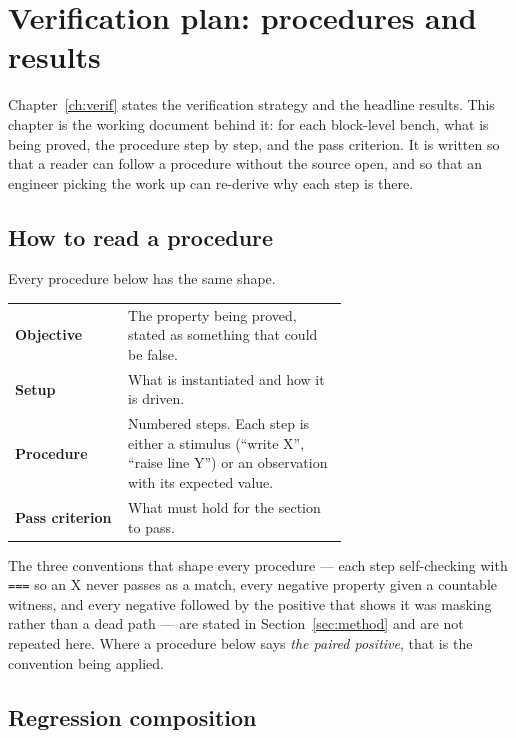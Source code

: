 \chapter{Verification plan: procedures and results}
\label{ch:verifplan}

Chapter~\ref{ch:verif} states the verification strategy and the headline
results. This chapter is the working document behind it: for each block-level
bench, what is being proved, the procedure step by step, and the pass criterion.
It is written so that a reader can follow a procedure without the source open,
and so that an engineer picking the work up can re-derive why each step is
there.

\section{How to read a procedure}

Every procedure below has the same shape.

\begin{table}[H]
\centering
\begin{tabular}{@{}lL{0.66\linewidth}@{}}
\toprule
\textbf{Objective} & The property being proved, stated as something that could
be false. \\
\textbf{Setup} & What is instantiated and how it is driven. \\
\textbf{Procedure} & Numbered steps. Each step is either a stimulus (``write
X'', ``raise line Y'') or an observation with its expected value. \\
\textbf{Pass criterion} & What must hold for the section to pass. \\
\bottomrule
\end{tabular}
\end{table}

The three conventions that shape every procedure --- each step self-checking
with \verb|===| so an X never passes as a match, every negative property given a
countable witness, and every negative followed by the positive that shows it was
masking rather than a dead path --- are stated in Section~\ref{sec:method} and
are not repeated here. Where a procedure below says \emph{the paired positive},
that is the convention being applied.

\section{Regression composition}

